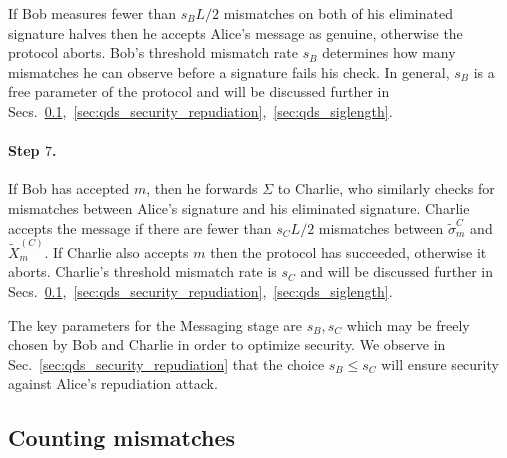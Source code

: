 If Bob measures fewer than $s_B L/2$ mismatches on both of his eliminated signature halves then he accepts Alice's message as genuine, otherwise the protocol aborts. Bob's threshold mismatch rate $s_B$ determines how many mismatches he can observe before a signature fails his check. In general, $s_B$ is a free parameter of the protocol and will be discussed further in Secs.~\ref{sec:qds_mismatches},~\ref{sec:qds_security_repudiation},~\ref{sec:qds_siglength}.


\paragraph{Step $7$.} If Bob has accepted $m$, then he forwards $\Sigma$ to Charlie, who similarly checks for mismatches between Alice's signature and his eliminated signature. Charlie accepts the message if %
there are fewer than $s_C L/2$  mismatches between $\tilde{\sigma}_m^C$ and $\tilde{X}_m^{\left(C\right)}$. If Charlie also accepts $m$ then the protocol has succeeded, otherwise it aborts.  Charlie's threshold mismatch rate is $s_C$ and will be discussed further in Secs.~\ref{sec:qds_mismatches},~\ref{sec:qds_security_repudiation},~\ref{sec:qds_siglength}.

The key parameters for the Messaging stage are $s_B, s_C$ which may be freely chosen by Bob and Charlie in order to optimize security. We observe in Sec.~\ref{sec:qds_security_repudiation} that the choice $s_B \le s_C$ will ensure security against Alice's repudiation attack.

\subsection{Counting mismatches}\label{sec:qds_mismatches}

